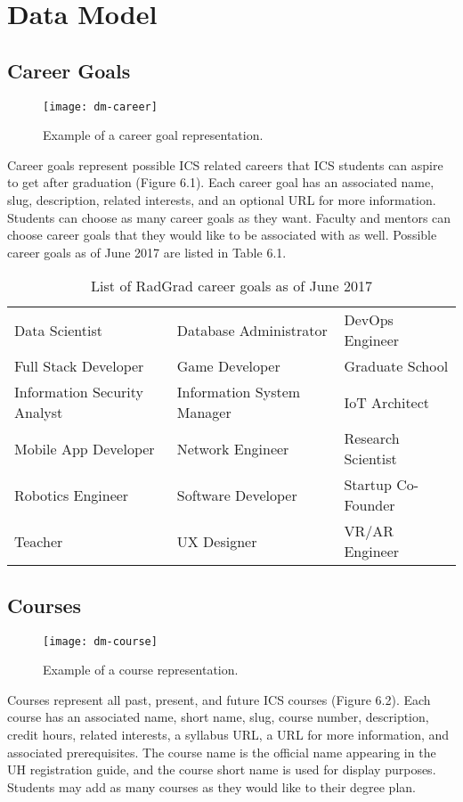 \section{Data Model}
\subsection{Career Goals}
\begin{figure}[h]
\centering
\texttt{[image: dm-career]}
\caption{Example of a career goal representation.}
\end{figure}
Career goals represent possible ICS related careers that ICS students can aspire to get after graduation (Figure 6.1). Each career goal has an associated name, slug, description, related interests, and an optional URL for more information. Students can choose as many career goals as they want. Faculty and mentors can choose career goals that they would like to be associated with as well. Possible career goals as of June 2017 are listed in Table 6.1.

\begin{table}[h!]
\centering
\begin{tabular}{ l l l } 
 Data Scientist & Database Administrator & DevOps Engineer \\ 
 Full Stack Developer & Game Developer & Graduate School \\ 
 Information Security Analyst & Information System Manager & IoT Architect \\ 
 Mobile App Developer & Network Engineer & Research Scientist \\
 Robotics Engineer & Software Developer & Startup Co-Founder \\
 Teacher & UX Designer & VR/AR Engineer 
\end{tabular}
\caption{List of RadGrad career goals as of June 2017}
\label{table:1}
\end{table}

\subsection{Courses}
\begin{figure}[h]
\centering
\texttt{[image: dm-course]}
\caption{Example of a course representation.}
\end{figure}
Courses represent all past, present, and future ICS courses (Figure 6.2). Each course has an associated name, short name, slug, course number, description, credit hours, related interests, a syllabus URL, a URL for more information, and associated prerequisites. The course name is the official name appearing in the UH registration guide, and the course short name is used for display purposes. Students may add as many courses as they would like to their degree plan. 

